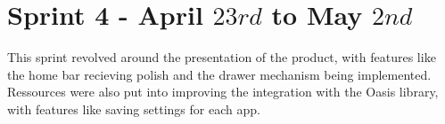 \section{Sprint 4 - April $23rd$ to May $2nd$}
This sprint revolved around the presentation of the product, with features like the home bar recieving polish and the drawer mechanism being implemented. 
Ressources were also put into improving the integration with the Oasis library, with features like saving settings for each app. 